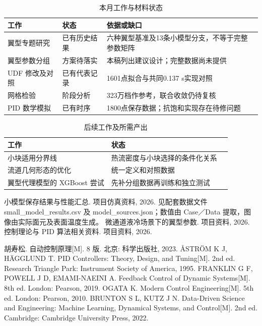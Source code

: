\documentclass[stage2,fontset=fandol]{ydzjreport}
\begin{document}
\clearpage
\setcounter{table}{6}
\begin{table}[H]\centering
\caption{本月工作与材料状态}\label{tab:tasks}
\begin{tabularx}{\textwidth}{@{}Y Y Y@{}}
\toprule
{} 工作 & 状态 & 依据或缺口 \\
\midrule
翼型专题研究 & 已有历史结果 & 六种翼型基准及13条小模型分支，不等于完整参数矩阵 \\
翼型参数分组 & 方案待落实 & 本稿列出建议设计；完整数据尚未提供 \\
UDF 修改及对照 & 已有代表记录 & 1601点拟合与共同0.137 s实现对照 \\
网格检验 & 阶段分析 & 323万档作参考，联合收敛仍待复核 \\
PID 数学模拟 & 已有时序 & 1800点保存数据；抗饱和实现存在待修问题 \\
\bottomrule\end{tabularx}\end{table}
\clearpage
\setcounter{table}{7}
\begin{table}[H]\centering
\caption{后续工作及所需产出}\label{tab:plan}
\begin{tabularx}{\textwidth}{@{}Y Y Y@{}}
\toprule
{} 工作 & 状态  \\
\midrule
小块适用分界线 & 热流密度与小块选择的条件化关系 \\
流道几何形态的优化 & 统一定义和对照数据  \\
翼型代理模型的 XGBoost 尝试 & 先补分组数据再训练和独立测试  \\
\bottomrule\end{tabularx}\end{table}
\clearpage
\begin{thebibliography}{9}

 小模型保存结果与性能汇总. 项目仿真资料, 2026. 见配套数据文件 small\_model\_results.csv 及 model\_sources.json；数值由 Case／Data 提取，图像由实际面元及表面温度生成。
 微通道液冷场景下的翼型参数. 项目资料, 2026.
 控制理论与 PID 算法相关资料. 项目资料, 2026.

 胡寿松. 自动控制原理[M]. 8 版. 北京: 科学出版社, 2023.
 {\AA}STR{\"O}M K J, H{\"A}GGLUND T. PID Controllers: Theory, Design, and Tuning[M]. 2nd ed. Research Triangle Park: Instrument Society of America, 1995.
 FRANKLIN G F, POWELL J D, EMAMI-NAEINI A. Feedback Control of Dynamic Systems[M]. 8th ed. London: Pearson, 2019.
 OGATA K. Modern Control Engineering[M]. 5th ed. London: Pearson, 2010.
 BRUNTON S L, KUTZ J N. Data-Driven Science and Engineering: Machine Learning, Dynamical Systems, and Control[M]. 2nd ed. Cambridge: Cambridge University Press, 2022.
\end{thebibliography}
\end{document}
